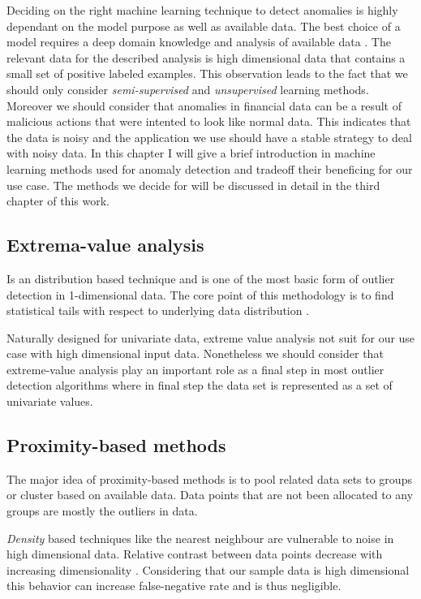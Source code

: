 Deciding on the right machine learning technique to detect anomalies is highly dependant on the model purpose as well as available data. The best choice of a model requires a deep domain knowledge and analysis of available data \cite{Aggarwal:2013}. The relevant data for the described analysis is high dimensional data that contains a small set of positive labeled examples. This observation leads to the fact that we should only consider \textit{semi-supervised} and \textit{unsupervised} learning methods. Moreover we should consider that anomalies in financial data can be a result of malicious actions that were intented to look like normal data. This indicates that the data is noisy and the application we use should have a stable strategy to deal with noisy data. In this chapter I will give a brief introduction in  machine learning methods used for anomaly detection and tradeoff their beneficing for our use case. The methods we decide for will be discussed in detail in the third chapter of this work.

\subsection{Extrema-value analysis}

Is an distribution based technique and is one of the most basic form of outlier detection in 1-dimensional data. The core point of this methodology is to find statistical tails with respect to underlying data distribution \cite{Aggarwal:2013}.

Naturally designed for univariate data, extreme value analysis not suit for our use case with high dimensional input data. Nonetheless we should consider that extreme-value analysis play an important role as a final step in most outlier detection algorithms where in final step the data set is represented as a set of univariate values.

\subsection{Proximity-based methods}

The major idea of proximity-based methods is to pool related data sets to groups or cluster based on available data. Data points that are not been allocated to any groups are mostly the outliers in data.

\textit{Density} based techniques like the nearest neighbour are vulnerable to noise in high dimensional data. Relative contrast between data points decrease with increasing dimensionality \cite{Hinneburg:2000:NNH:645926.671675}. Considering that our sample data is high dimensional this behavior can increase false-negative rate and is thus negligible. 

